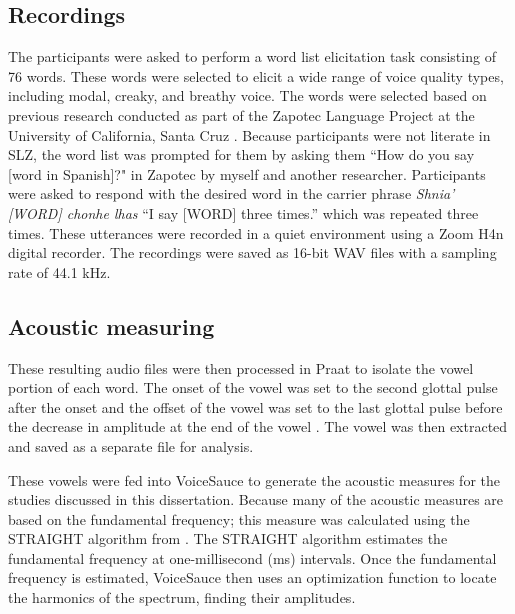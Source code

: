 \subsection{Recordings} \label{sec:acousticlandscape:recordings} 
The participants were asked to perform a word list elicitation task consisting of 76 words. These words were selected to elicit a wide range of voice quality types, including modal, creaky, and breathy voice. The words were selected based on previous research conducted as part of the Zapotec Language Project at the University of California, Santa Cruz \citep{ZapotecLanguageProject}. 
Because participants were not literate in SLZ, the word list was prompted for them by asking them ``How do you say [word in Spanish]?" in Zapotec by myself and another researcher. Participants were asked to respond with the desired word in the carrier phrase \textit{Shnia' [WORD] chonhe lhas} ``I say [WORD] three times.'' which was repeated three times. These utterances were recorded in a quiet environment using a Zoom H4n digital recorder. The recordings were saved as 16-bit WAV files with a sampling rate of 44.1 kHz.

\subsection{Acoustic measuring} \label{sec:acousticlandscape:analysis}
These resulting audio files were then processed in Praat to isolate the vowel portion of each word. The onset of the vowel was set to the second glottal pulse after the onset and the offset of the vowel was set to the last glottal pulse before the decrease in amplitude at the end of the vowel \citep{garellekAcousticDiscriminabilityComplex2020}. The vowel was then extracted and saved as a separate file for analysis.

These vowels were fed into VoiceSauce \citep{shueVOICESAUCEProgramVoice2009} to generate the acoustic measures for the studies discussed in this dissertation. Because many of the acoustic measures are based on the fundamental frequency; this measure was calculated using the STRAIGHT algorithm from \citep{kawaharaInstantaneousfrequencybasedPitchExtraction1998}. The STRAIGHT algorithm estimates the fundamental frequency at one-millisecond (ms) intervals. Once the fundamental frequency is estimated, VoiceSauce then uses an optimization function to locate the harmonics of the spectrum, finding their amplitudes.

